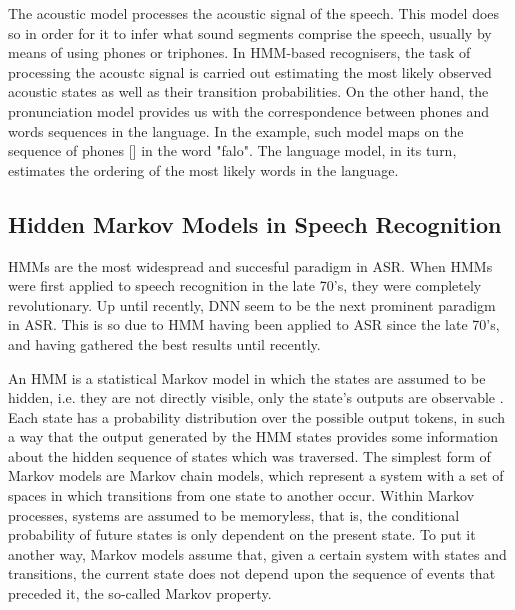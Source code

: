 The acoustic model processes the acoustic signal of the speech. This model does so in order for it to infer what sound segments comprise the speech, usually by means of using phones or triphones. In HMM-based recognisers, the task of processing the acoustc signal is carried out  estimating the most likely observed acoustic states as well as their transition probabilities. On the other hand, the pronunciation model provides us with the correspondence between phones and words sequences in the language. In the example, such model maps on the sequence of phones [] in the word "falo". The language model, in its turn, estimates the ordering of the most likely words in the language. 

\subsection{Hidden Markov Models in Speech Recognition}

\ac{HMM}s are the most widespread and succesful paradigm in \ac{ASR}. When \ac{HMM}s were first applied
to speech recognition in the late 70's, they were completely revolutionary.
Up until recently, \ac{DNN} seem to be the next prominent paradigm in \ac{ASR}.
This is so due to \ac{HMM} having been applied
to \ac{ASR} since the late 70's, and having gathered the best results until recently.

An \ac{HMM} is a statistical Markov model in which the states are assumed to be hidden, i.e. they are
not directly visible, only the state's outputs are observable \cite{Fink2014}. Each state has a probability distribution over the possible output tokens, in such a way that the output generated by the HMM states provides some information about the hidden sequence of states which was traversed.  The simplest form of Markov models are Markov chain models, 
which represent a system with a set of spaces in which transitions from one state to another occur. 
Within Markov processes, systems are assumed to be memoryless, that is, the conditional probability
of future states is only dependent on the present state. To put it another way, Markov models assume that,
given a certain system with states and transitions, the current state does not depend upon the 
sequence of events that preceded it, the so-called Markov property. 

